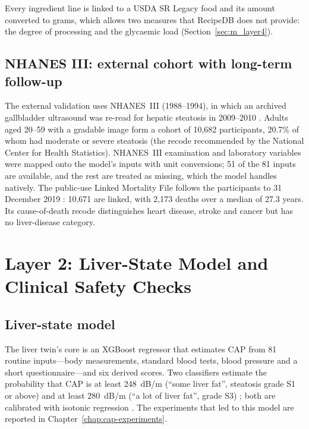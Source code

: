 Every ingredient line is linked to a USDA SR Legacy food and its amount
converted to grams, which allows two measures that RecipeDB does not provide:
the degree of processing and the glycaemic load (Section~\ref{sec:m_layer4}).

\subsection{NHANES III: external cohort with long-term follow-up}

The external validation uses NHANES~III (1988--1994), in which an archived
gallbladder ultrasound was re-read for hepatic steatosis in 2009--2010
\cite{nhanes3_ultrasound}. Adults aged 20--59 with a gradable image form a
cohort of 10{,}682 participants, 20.7\% of whom had moderate or severe
steatosis (the recode recommended by the National Center for Health
Statistics). NHANES~III examination and laboratory variables were mapped onto
the model's inputs with unit conversions; 51 of the 81 inputs are available,
and the rest are treated as missing, which the model handles natively. The
public-use Linked Mortality File follows the participants to 31 December 2019
\cite{nchs2022mortality}: 10{,}671 are linked, with 2{,}173 deaths over a
median of 27.3 years. Its cause-of-death recode distinguishes heart disease,
stroke and cancer but has no liver-disease category.

\section{Layer 2: Liver-State Model and Clinical Safety Checks}
\label{sec:m_layer2}

\subsection{Liver-state model}

The liver twin's core is an XGBoost regressor \cite{chen2016xgboost} that
estimates CAP from 81 routine inputs---body measurements, standard blood
tests, blood pressure and a short questionnaire---and six derived scores.
Two classifiers estimate the probability that CAP is at least 248~dB/m
(``some liver fat'', steatosis grade S1 or above) and at least 280~dB/m
(``a lot of liver fat'', grade S3) \cite{karlas2017cap}; both are calibrated
with isotonic regression \cite{zadrozny2002calibration}. The experiments that
led to this model are reported in Chapter~\ref{chap:cap-experiments}.

